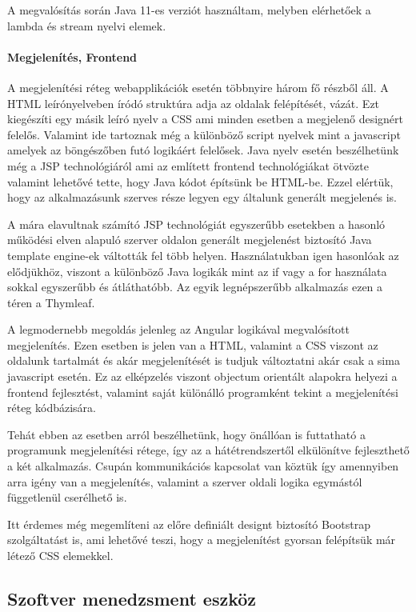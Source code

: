 A megvalósítás során Java 11-es verziót használtam, melyben elérhetőek a lambda és stream nyelvi elemek.

\paragraph{Megjelenítés, Frontend}

A megjelenítési réteg webapplikációk esetén többnyire három fő részből áll. A HTML leírónyelveben íródó struktúra adja az oldalak felépítését, vázát. Ezt kiegészíti egy másik leíró nyelv a CSS ami minden esetben a megjelenő designért felelős. Valamint ide tartoznak még a különböző script nyelvek mint a javascript amelyek az böngészőben futó logikáért felelősek.
\vskip 0.2in
Java nyelv esetén beszélhetünk még a JSP technológiáról ami az említett frontend technológiákat ötvözte valamint lehetővé tette, hogy Java kódot építsünk be HTML-be. Ezzel elértük, hogy az alkalmazásunk szerves része legyen egy általunk generált megjelenés is. 

A mára elavultnak számító JSP technológiát egyszerűbb esetekben a hasonló működési elven alapuló szerver oldalon generált megjelenést biztosító Java template engine-ek váltották fel több helyen. Használatukban igen hasonlóak az elődjükhöz, viszont a különböző Java logikák mint az if vagy a for használata sokkal egyszerűbb és átláthatóbb. Az egyik legnépszerűbb alkalmazás ezen a téren a Thymleaf. 

\vskip 0.2in
A legmodernebb megoldás jelenleg az Angular logikával megvalósított megjelenítés. Ezen esetben is jelen van a HTML, valamint a CSS viszont az oldalunk tartalmát és akár megjelenítését is tudjuk változtatni akár csak a sima javascript esetén. Ez az elképzelés viszont objectum orientált alapokra helyezi a frontend fejlesztést, valamint saját különálló programként tekint a megjelenítési réteg kódbázisára. 

Tehát ebben az esetben arról beszélhetünk, hogy önállóan is futtatható a programunk megjelenítési rétege, így az a hátétrendszertől elkülönítve fejleszthető a két alkalmazás. Csupán kommunikációs kapcsolat van köztük így amennyiben arra igény van a megjelenítés, valamint a szerver oldali logika egymástól függetlenül cserélhető is.

\vskip 0.2in
Itt érdemes még megemlíteni az előre definiált designt biztosító Bootstrap szolgáltatást is, ami lehetővé teszi, hogy a megjelenítést gyorsan felépítsük már létező CSS elemekkel.

\subsection{Szoftver menedzsment eszköz}

